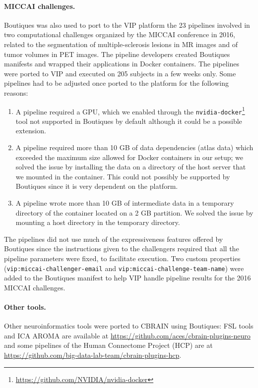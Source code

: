 \documentclass{article}
\begin{document}
\paragraph{MICCAI challenges.} Boutiques was also used to port to the VIP platform the 23 pipelines
involved in two computational challenges organized by the MICCAI
conference in 2016, related to the segmentation of multiple-sclerosis
lesions in MR images and of tumor volumes in PET images. The pipeline
developers created Boutiques manifests and wrapped their applications
in Docker containers. The pipelines were ported to VIP and executed on
205 subjects in a few weeks only. Some pipelines had to be adjusted
once ported to the platform for the following reasons:
\begin{enumerate}
\item A pipeline
  required a GPU, which we enabled through the
  \texttt{nvidia-docker}\footnote{\url{https://github.com/NVIDIA/nvidia-docker}}
  tool not supported in Boutiques by default although it could be a possible extension.
\item A pipeline required
  more than 10 GB of data dependencies (atlas data) which exceeded the
  maximum size allowed for Docker containers in our setup; we solved the
  issue by installing the data on a directory of the host server that we
  mounted in the container. This could not possibly be supported by
  Boutiques since it is very dependent on the platform.
\item A pipeline wrote more than 10 GB of intermediate data in a
  temporary directory of the container located on a 2 GB partition. We
  solved the issue by mounting a host directory in the temporary directory.
\end{enumerate}
The pipelines did not use much of the expressiveness features offered
by Boutiques since the instructions given to the challengers required
that all the pipeline parameters were fixed, to facilitate
execution. Two custom properties (\texttt{vip:miccai-challenger-email}
and \texttt{vip:miccai-challenge-team-name}) were added to the
Boutiques manifest to help VIP handle pipeline results for the 2016
MICCAI challenges.

\paragraph{Other tools.} Other neuroinformatics tools were ported to CBRAIN using Boutiques:
FSL tools and ICA AROMA are available at
\url{https://github.com/aces/cbrain-plugins-neuro} and some pipelines
of the Human Connectome Project (HCP) are at
\url{https://github.com/big-data-lab-team/cbrain-plugins-hcp}.
\end{document}
